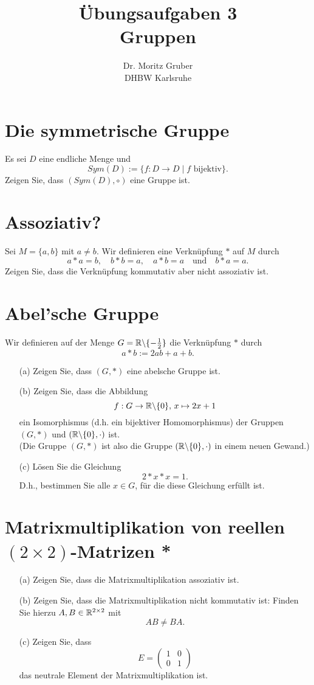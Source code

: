 \documentclass[
				a4paper,
				10pt
			]
			{scrartcl}
\author{Dr. Moritz Gruber\\ DHBW Karlsruhe}
\title{\"Ubungsaufgaben 3\\ 
	Gruppen
}
\date{}
\begin{document}
\maketitle

\section{Die symmetrische Gruppe}
Es sei $D$ eine endliche Menge und 
$$
Sym(D):=\{f:D \to D \mid f \text{ bijektiv}\}.
$$
Zeigen Sie, dass $(Sym(D),\circ)$ eine Gruppe ist.

\section{Assoziativ?}

Sei $M = \{a,b\}$ mit $a\neq b$. Wir definieren eine Verkn\"upfung $\ast$ auf $M$ durch
$$
	a\ast a = b, \quad b\ast b = a, \quad a \ast b = a \quad \text{und} \quad b\ast a = a.
$$ 
Zeigen Sie, dass die Verkn\"upfung kommutativ aber nicht assoziativ ist.

\section{Abel'sche Gruppe}
Wir definieren auf der Menge $G= \mathbb{R}\backslash\{-\frac{1}{2}\}$ die Verkn\"upfung $\ast$ durch
$$
	a\ast b := 2ab +a +b.
$$
\begin{itemize}
	\item[(a)] Zeigen Sie, dass $(G,\ast)$ eine abelsche Gruppe ist.
	\item[(b)] Zeigen Sie, dass die Abbildung
			$$
				f: G \to \mathbb{R}\backslash\{0\},\, x\mapsto 2x + 1
			$$
			ein Isomorphismus (d.h. ein bijektiver Homomorphismus) der Gruppen $(G,\ast)$ und $(\mathbb{R}\backslash\{0\}, \cdot)$ ist.\\
			(Die Gruppe $(G,\ast)$ ist also die Gruppe $(\mathbb{R}\backslash\{0\}, \cdot)$ in einem neuen Gewand.)
	\item[(c)] L\"osen Sie die Gleichung
			$$
				2\ast x\ast x = 1.
			$$
			D.h., bestimmen Sie alle $x\in G$, f\"ur die diese Gleichung erf\"ullt ist.
\end{itemize}

\section{Matrixmultiplikation von reellen $(2\times 2)$-Matrizen *}

\begin{itemize}
	\item[(a)] Zeigen Sie, dass die Matrixmultiplikation assoziativ ist.
	\item[(b)] Zeigen Sie, dass die Matrixmultiplikation nicht kommutativ ist: 
			Finden Sie hierzu $A,B \in \mathbb{R}^{2\times 2}$ mit
			$$
				AB \neq BA.
			$$
	\item[(c)] Zeigen Sie, dass  
			$$
				E
				=
				\begin{pmatrix}
					1	&	0\\
					0	&	1
				\end{pmatrix}
			$$ 
			das neutrale Element der Matrixmultiplikation ist. 
	
\end{itemize}
\end{document}

